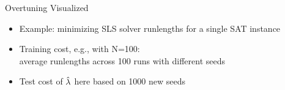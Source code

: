\begin{frame}[fragile]{Overtuning Visualized}

\begin{itemize}
\item Example: minimizing SLS solver runlengths for a single SAT instance
\item \alert{Training cost}, e.g., with N=100:\\average runlengths across 100 runs with different seeds
\item \alert{Test cost} of $\hat{\mathbf{\lambda}}$ here based on 1000 new seeds 
\end{itemize}	

\pause


\begin{center}
\end{center}


\end{frame}

